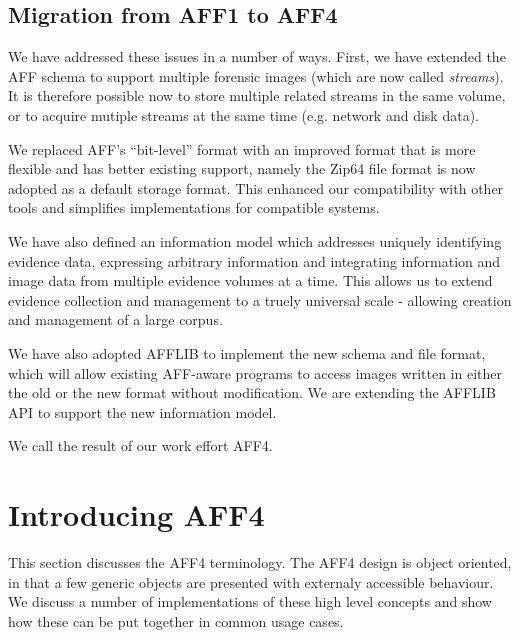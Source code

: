 \documentclass[10pt, conference]{IEEEtran}
\begin{document}
\subsection{Migration from AFF1 to AFF4}
We have addressed these issues in a number of ways. First, we have
extended the AFF schema to support multiple forensic images (which are
now called \emph{streams}). It is therefore possible now to store
multiple related streams in the same volume, or to acquire mutiple
streams at the same time (e.g. network and disk data).

We replaced AFF's ``bit-level'' format with an improved format that is
more flexible and has better existing support, namely the Zip64 file
format is now adopted as a default storage format. This enhanced our
compatibility with other tools and simplifies implementations for
compatible systems.

We have also defined an information model which addresses uniquely
identifying evidence data, expressing arbitrary information and
integrating information and image data from multiple evidence volumes
at a time. This allows us to extend evidence collection and management
to a truely universal scale - allowing creation and management of a
large corpus.

We have also adopted AFFLIB to implement the new schema and file
format, which will allow existing AFF-aware programs to access images
written in either the old or the new format without modification. We
are extending the AFFLIB API to support the new information model.

We call the result of our work effort AFF4.

\section{Introducing AFF4}

This section discusses the AFF4 terminology. The AFF4 design is object
oriented, in that a few generic objects are presented with externaly
accessible behaviour. We discuss a number of implementations of these
high level concepts and show how these can be put together in common
usage cases.
\end{document}
